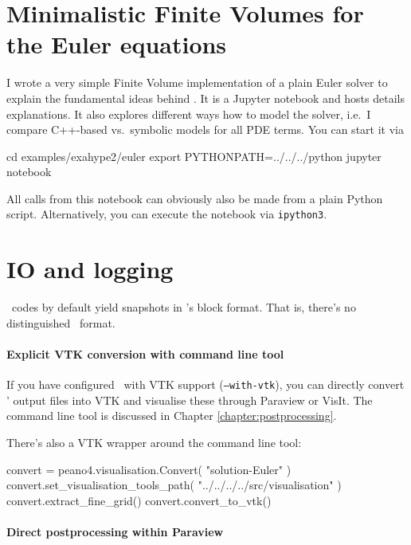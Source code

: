 \section{Minimalistic Finite Volumes for the Euler equations}
\label{section:exahype:fv}

I wrote a very simple Finite Volume implementation of a plain Euler solver to
explain the fundamental ideas behind \ExaHyPE.
It is a Jupyter notebook and hosts details explanations.
It also explores different ways how to model the solver, i.e.~I compare
C++-based vs.~symbolic models for all PDE terms.
You can start it via


\begin{code}
cd examples/exahype2/euler
export PYTHONPATH=../../../python
jupyter notebook
\end{code}


\noindent
All calls from this notebook can obviously also be made from a plain Python
script. 
Alternatively, you can execute the notebook via \texttt{ipython3}.


\section{IO and logging}


\ExaHyPE\ codes by default yield snapshots in \Peano's block format. 
That is, there's no distinguished \ExaHyPE\ format.


\paragraph{Explicit VTK conversion with command line tool}
If you have configured \Peano\ with VTK support (\texttt{--with-vtk}), you can
directly convert \ExaHyPE' output files into VTK and visualise these through
Paraview or VisIt.
The command line tool is discussed in Chapter
\ref{chapter:postprocessing}.


There's also a VTK wrapper around the command line tool:

\begin{code}
convert = peano4.visualisation.Convert( "solution-Euler" )
convert.set_visualisation_tools_path( "../../../../src/visualisation" )
convert.extract_fine_grid()
convert.convert_to_vtk()
\end{code}


\paragraph{Direct postprocessing within Paraview}

